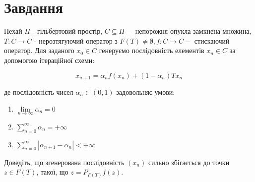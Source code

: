 
\chapter{Завдання \theHchapter}

\begin{tcolorbox}[title=Завдання]
    Нехай $H$ - гільбертовий простір, $C \subseteq H-$ непорожня опукла замкнена множина, $T: C \rightarrow C$ - нерозтягуючий оператор з $F(T) \neq \emptyset, f: C \rightarrow C-$ стискаючий оператор. Для заданого $x_{0} \in C$ генеруємо послідовність елементів $x_{n} \in C$ за допомогою ітераційної схеми:

    $$
    x_{n+1}=\alpha_{n} f\left(x_{n}\right)+\left(1-\alpha_{n}\right) T x_{n}
    $$

    де послідовність чисел $\alpha_{n} \in(0,1)$ задовольняє умови:

    \begin{enumerate}
        \item $\lim\limits_{n \rightarrow \infty} \alpha_{n}=0$

        \item $\sum\limits_{n=0}^{\infty} \alpha_{n}=+\infty$

        \item $\sum\limits_{n=0}^{\infty}
        \left|\alpha_{n+1}-\alpha_{n}\right|<+\infty$

    \end{enumerate}

    Доведіть, що згенерована послідовність $\left(x_{n}\right)$ сильно збігається до точки $z \in F(T)$, такої, що $z=P_{F(T)} f(z)$.


\end{tcolorbox}


